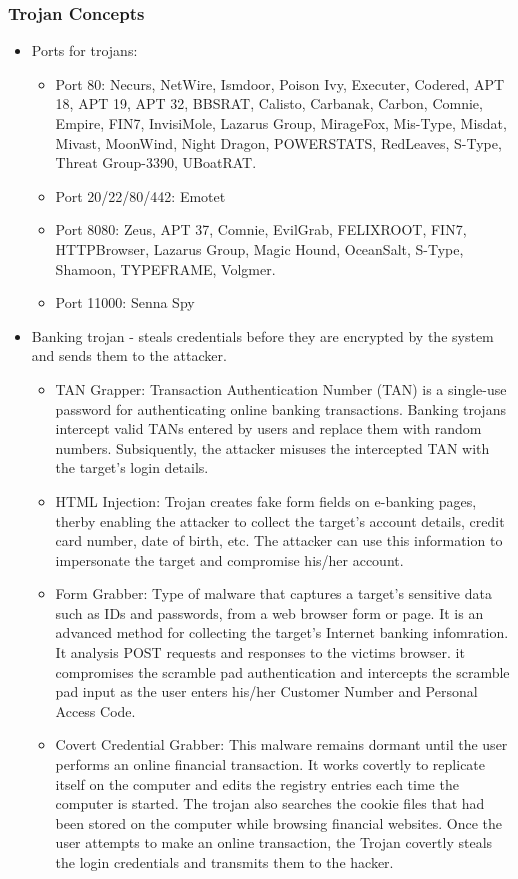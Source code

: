 \subsubsection{Trojan Concepts}
\begin{itemize}
    \item Ports for trojans:
    \begin{itemize}
        \item Port 80: Necurs, NetWire, Ismdoor, Poison Ivy, Executer, Codered, APT 18, APT 19, APT 32, BBSRAT, Calisto, Carbanak, Carbon, Comnie, Empire, FIN7, InvisiMole, Lazarus Group, MirageFox, Mis-Type, Misdat, Mivast, MoonWind, Night Dragon, POWERSTATS, RedLeaves, S-Type, Threat Group-3390, UBoatRAT.
        \item Port 20/22/80/442: Emotet
        \item Port 8080: Zeus, APT 37, Comnie, EvilGrab, FELIXROOT, FIN7, HTTPBrowser, Lazarus Group, Magic Hound, OceanSalt, S-Type, Shamoon, TYPEFRAME, Volgmer.
        \item Port 11000: Senna Spy
    \end{itemize}
    \item Banking trojan - steals credentials before they are encrypted by the system and sends them to the attacker.
    \begin{itemize}
        \item TAN Grapper: Transaction Authentication Number (TAN) is a single-use password for authenticating online banking transactions. Banking trojans intercept valid TANs entered by users and replace them with random numbers. Subsiquently, the attacker misuses the intercepted TAN with the target's login details.
        \item HTML Injection: Trojan creates fake form fields on e-banking pages, therby enabling the attacker to collect the target's account details, credit card number, date of birth, etc. The attacker can use this information to impersonate the target and compromise his/her account.
        \item Form Grabber: Type of malware that captures a target's sensitive data such as IDs and passwords, from a web browser form or page. It is an advanced method for collecting the target's Internet banking infomration. It analysis POST requests and responses to the victims browser. it compromises the scramble pad authentication and intercepts the scramble pad input as the user enters his/her Customer Number and Personal Access Code.
        \item Covert Credential Grabber: This malware remains dormant until the user performs an online financial transaction. It works covertly to replicate itself on the computer and edits the registry entries each time the computer is started. The trojan also searches the cookie files that had been stored on the computer while browsing financial websites. Once the user attempts to make an online transaction, the Trojan covertly steals the login credentials and transmits them to the hacker.

\end{itemize}
\end{itemize}
